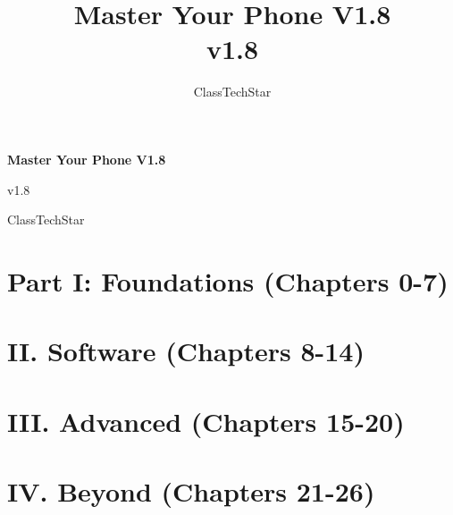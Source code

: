 \documentclass[11pt,a4paper,openany]{book}
\title{Master Your Phone V1.8\\ \large v1.8}
\author{ClassTechStar}
\date{}
\begin{document}
\begin{titlepage}
\centering
\vspace*{0.28\textheight}
{\Huge\bfseries Master Your Phone V1.8\par}
\vspace{1.2em}
{\Large v1.8\par}
\vfill
{\large ClassTechStar\par}
\end{titlepage}
\frontmatter
\tableofcontents
\mainmatter
\part*{Part I: Foundations (Chapters 0-7)}










\part*{II. Software (Chapters 8-14)}








\part*{III. Advanced (Chapters 15-20)}







\part*{IV. Beyond (Chapters 21-26)}







\end{document}
